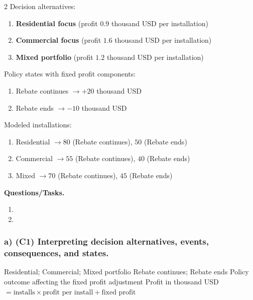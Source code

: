 	\begin{multicols}{2}
		Decision alternatives:
		\begin{enumerate}[label=\arabic*.]
			\item \textbf{Residential focus} (profit $0.9$ thousand USD per installation)
			\item \textbf{Commercial focus} (profit $1.6$ thousand USD per installation)
			\item \textbf{Mixed portfolio} (profit $1.2$ thousand USD per installation)
		\end{enumerate}
	
		Policy states with fixed profit components:
		\begin{enumerate}[label=\arabic*.]
			\item Rebate continues $\to +20$ thousand USD
			\item Rebate ends $\to -10$ thousand USD
		\end{enumerate}
	
			\columnbreak
	
		Modeled installations:
		\begin{enumerate}[label=\arabic*.]
			\item Residential $\to 80$ (Rebate continues), $50$ (Rebate ends)
			\item Commercial $\to 55$ (Rebate continues), $40$ (Rebate ends)
			\item Mixed $\to 70$ (Rebate continues), $45$ (Rebate ends)
		\end{enumerate}
	\end{multicols}

	\textbf{Questions/Tasks.}
	\begin{enumerate}[label=\textbf{\alph*)}]
		\item {}
		\item {}
	\end{enumerate}
	
	\subsubsection*{a) \textbf{(C1)} Interpreting decision alternatives, events, consequences, and states.}
	\label{subsec:problem12-solar-installation-bids-c1}
	\DecisionElementsTable
	{Residential; Commercial; Mixed portfolio}
	{Rebate continues; Rebate ends}
	{Policy outcome affecting the fixed profit adjustment}
	{Profit in thousand USD $= \text{installs} \times \text{profit per install} + \text{fixed profit}$}
	
